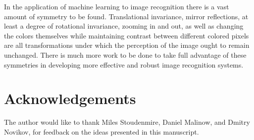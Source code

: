 \documentclass[twocolumn, prl]{revtex4-1}
\begin{document}
In the application of machine learning to image recognition there is a vast amount of symmetry to be found. Translational invariance, mirror reflections, at least a degree of rotational invariance, zooming in and out, as well as changing the colors themselves while maintaining contrast between different colored pixels are all transformations under which the perception of the image ought to remain unchanged. There is much more work to be done to take full advantage of these symmetries in developing more effective and robust image recognition systems.


\section{Acknowledgements}

The author would like to thank Miles Stoudenmire, Daniel Malinow, and Dmitry Novikov, for feedback on the ideas presented in this manuscript.


\vskip -0.2in

%


%



\vskip 0.2in
\end{document}
